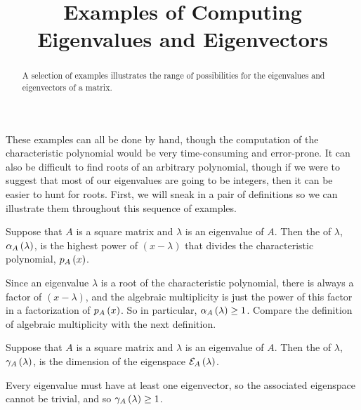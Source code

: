 \documentclass{ximera}
\title{Examples of Computing Eigenvalues and Eigenvectors}
\begin{document}
\begin{abstract}
  A selection of examples illustrates the range of possibilities for the eigenvalues and eigenvectors of a matrix. 
\end{abstract}
\maketitle

These examples can all be done by hand, though the computation of the
characteristic polynomial would be very time-consuming and
error-prone.  It can also be difficult to find roots of an arbitrary
polynomial, though if we were to suggest that most of our eigenvalues
are going to be integers, then it can be easier to hunt for roots.
First, we will sneak in a pair of definitions so we can illustrate
them throughout this sequence of examples.

\begin{definition}
  Suppose that $A$ is a square matrix and $\lambda$ is an eigenvalue
  of $A$.  Then the  of $\lambda$,
  $\alpha_{A}\left(\lambda\right)$, is the highest power of $(x-\lambda)$ that
  divides the characteristic polynomial, $p_{A}\left(x\right)$.
\end{definition}

Since an eigenvalue $\lambda$ is a root of the characteristic
polynomial, there is always a factor of $(x-\lambda)$, and the
algebraic multiplicity is just the power of this factor in a
factorization of $p_{A}\left(x\right)$.  So in particular,
$\alpha_{A}\left(\lambda\right)\geq 1$.  Compare the definition of algebraic
multiplicity with the next definition.

\begin{definition}
  Suppose that $A$ is a square matrix and $\lambda$ is an eigenvalue
  of $A$.  Then the  of $\lambda$,
  $\gamma_{A}\left(\lambda\right)$, is the dimension of the eigenspace
  $\mathcal{E}_{A}\left(\lambda\right)$.
\end{definition}

Every eigenvalue must have at least one eigenvector, so the associated
eigenspace cannot be trivial, and so $\gamma_{A}\left(\lambda\right)\geq 1$.
\end{document}
